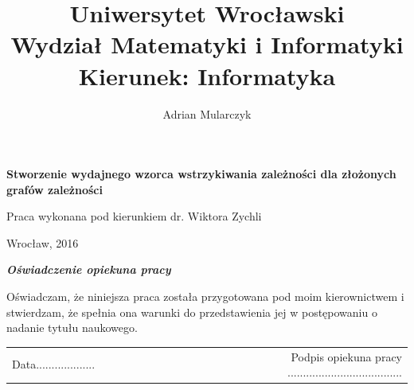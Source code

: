 \documentclass[12pt]{article}
\title{\LARGE{Uniwersytet Wrocławski}\\
\Large{Wydział Matematyki i Informatyki}\\
\large{Kierunek: Informatyka}}
\date{}
\begin{document}
\pagestyle{empty}

\begin{titlepage}
\maketitle
\thispagestyle{empty}


\begin{center}
\author{\LARGE{Adrian Mularczyk}}
\vspace{30pt}

\huge{\textbf{Stworzenie wydajnego wzorca wstrzykiwania zależności dla złożonych grafów zależności}}
\vspace{50pt}
\end{center}

\begin{flushright}
\large{Praca wykonana pod kierunkiem}
\large{dr. Wiktora Zychli}
\end{flushright}

\vfill
\begin{center}
\begin{large}
Wrocław, 2016
\end{large}
\end{center}
\end{titlepage}


\setlength{\parindent}{0pt}	%
\setlength{\parskip}{1.5ex} 
\renewcommand*{\figurename}{Rys.}
\renewcommand*{\tablename}{Tab.} 
\renewcommand{\captionsize}{\small}

\setlength{\intextsep}{0pt}


\newpage
\setcounter{page}{2}
\pagestyle{plain}
\textcolor{white}{  }
\begin{center}
\vspace{50pt}
\textbf{\emph{Oświadczenie opiekuna pracy}}\\
\end{center}
Oświadczam, że niniejsza praca została przygotowana pod moim kierownictwem i stwierdzam, że spełnia ona warunki do przedstawienia jej w postępowaniu o nadanie tytułu naukowego.\\

\vspace{54pt}

\begin{tabular}{lccccccccr}
Data................... & & & & & & & & & Podpis opiekuna pracy ..................................... \\
\end{tabular}
\end{document}
